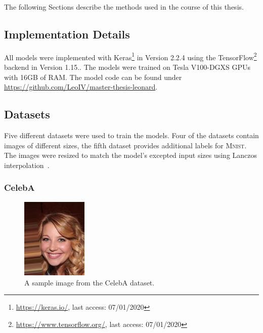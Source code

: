 The following Sections describe the methods used in the course of this thesis.

\subsection{Implementation Details}\label{subsec:implementation-details}

All models were implemented with Keras\footnote{\href{https://keras.io/}{https://keras.io/}, last access: 07/01/2020} in Version 2.2.4 using the TensorFlow\footnote{\href{https://www.tensorflow.org/}{https://www.tensorflow.org/}, last access: 07/01/2020} backend in Version 1.15..
The models were trained on Tesla V100-DGXS GPUs with 16GB of RAM.
The model code can be found under \href{https://github.com/LeoIV/master-thesis-leonard}{https://github.com/LeoIV/master-thesis-leonard}.

\subsection{Datasets}\label{subsec:datasets}

Five different datasets were used to train the models.
Four of the datasets contain images of different sizes, the fifth dataset provides additional labels for \textsc{Mnist}.
The images were resized to match the model's excepted input sizes using Lanczos interpolation~\citep[pp. 223, ff]{burger2009principles}.

\subsubsection{CelebA}\label{subsubsec:celeba_dataset}

\begin{figure}
    \begin{center}
        \includegraphics[width=0.28\textwidth]{images/celeba_sample_63.jpg}
    \end{center}
    \caption[CelebA dataset sample image]{A sample image from the CelebA dataset.}
    \label{fig:celeba_sample}
\end{figure}


